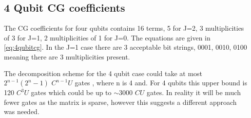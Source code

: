 \documentclass[12pt]{article}
\begin{document}
\subsection{4 Qubit CG coefficients}

The CG coefficients for four qubits contains 16 terms, 5 for J=2, 3 multiplicities of 3 for J=1, 2 multiplicities of 1 for J=0. The equations are given in \autoref{eq:4qubitcg}. In the J=1 case there are 3 acceptable bit strings, 0001, 0010, 0100 meaning there are 3 multiplicities present. 

The decomposition scheme for the 4 qubit case could take at most $2^{n-1}(2^n-1)$ $C^{n-1}U$ gates \cite{li2013decomposition}, where n is 4 and. For 4 qubits this upper bound is 120 $C^3U$ gates which could be up to $\sim 3000$ $CU$ gates. In reality it will be much fewer gates as the matrix is sparse, however this suggests a different approach was needed.
\end{document}
